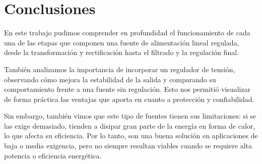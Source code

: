 \documentclass[chaptersright]{informeutn}
\begin{document}
  \chapter{Conclusiones}
    En este trabajo pudimos comprender en profundidad el funcionamiento de cada una de las etapas que componen una fuente
    de alimentación lineal regulada, desde la transformación y rectificación hasta el filtrado y la regulación final.

    También analizamos la importancia de incorporar un regulador de tensión, observando cómo mejora la estabilidad de la
    salida y comparando su comportamiento frente a una fuente sin regulación. Esto nos permitió visualizar de forma
    práctica las ventajas que aporta en cuanto a protección y confiabilidad.

    Sin embargo, también vimos que este tipo de fuentes tienen sus limitaciones: si se las exige demasiado, tienden a 
    disipar gran parte de la energía en forma de calor, lo que afecta su eficiencia. Por lo tanto, son una buena solución
    en aplicaciones de baja o media exigencia, pero no siempre resultan viables cuando se requiere alta potencia o eficiencia energética.
\end{document}
